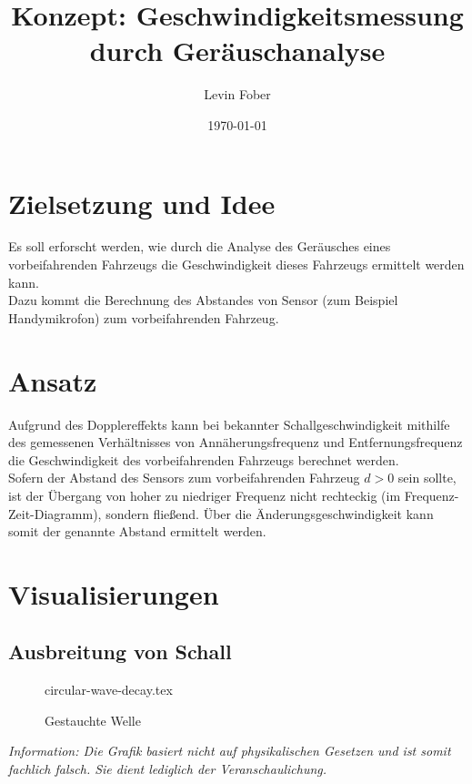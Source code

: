 \documentclass[12pt, a4paper]{article}
\title{Konzept: Ge\-schwin\-dig\-keits\-mes\-sung durch Ge\-räusch\-ana\-ly\-se}
\author{Levin Fober}
\date{\today}
\begin{document}
\maketitle

\tableofcontents

\newpage

\section{Zielsetzung und Idee}
Es soll erforscht werden, wie durch die Analyse des Geräusches eines
vorbeifahrenden Fahrzeugs die Geschwindigkeit dieses Fahrzeugs ermittelt werden
kann. \\
Dazu kommt die Berechnung des Abstandes von Sensor (zum Beispiel Handymikrofon)
zum vorbeifahrenden Fahrzeug.

\section{Ansatz}
Aufgrund des Dopplereffekts kann bei bekannter Schallgeschwindigkeit mithilfe
des gemessenen Verhältnisses von Annäherungsfrequenz und Entfernungsfrequenz die
Geschwindigkeit des vorbeifahrenden Fahrzeugs berechnet werden.\\
Sofern der Abstand des Sensors zum vorbeifahrenden Fahrzeug \(d > 0\) sein
sollte, ist der Übergang von hoher zu niedriger Frequenz nicht rechteckig (im
Frequenz-Zeit-Diagramm), sondern fließend. Über die Änderungsgeschwindigkeit
kann somit der genannte Abstand ermittelt werden.

\section{Visualisierungen}

\subsection{Ausbreitung von Schall}

\begin{minipage}{0.5\textwidth}
    \begin{figure}[H]
        {circular-wave-decay.tex}
        \caption{Gestauchte Welle}
    \end{figure}
\end{minipage} \hfill
\begin{minipage}{0.45\textwidth}
    \begin{footnotesize}
        \emph{Information: Die Grafik basiert nicht auf physikalischen Gesetzen und ist somit fachlich falsch. Sie dient lediglich der Veranschaulichung.}
    \end{footnotesize}
\end{minipage}
\vspace{1cm}
\end{document}
